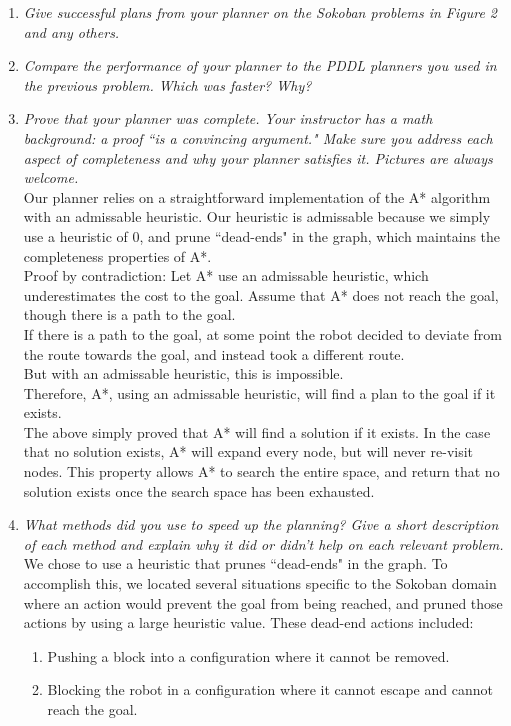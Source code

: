 \documentclass{article}
\begin{document}
\begin{enumerate}
\item{\textit{Give successful plans from your planner on the Sokoban problems in Figure 2 and any others.\\}}
\item{\textit{Compare the performance of your planner to the PDDL planners you used in the previous problem. Which was faster? Why?\\}}
\item{\textit{Prove that your planner was complete. Your instructor has a math background: a proof ``is a convincing argument." Make sure you address each aspect of completeness and why your planner satisfies it. Pictures are always welcome.\\}}
Our planner relies on a straightforward implementation of the A* algorithm with an admissable heuristic.  Our heuristic is admissable because we simply use a heuristic of 0, and prune ``dead-ends" in the graph, which maintains the completeness properties of A*.\\

Proof by contradiction:
Let A* use an admissable heuristic, which underestimates the cost to the goal.
Assume that A* does not reach the goal, though there is a path to the goal.\\
If there is a path to the goal, at some point the robot decided to deviate from the route towards the goal, and instead took a different route.\\
But with an admissable heuristic, this is impossible.\\
Therefore, A*, using an admissable heuristic, will find a plan to the goal if it exists.\\

The above simply proved that A* will find a solution if it exists.  In the case that no solution exists, A* will expand every node, but will never re-visit nodes.  This property allows A* to search the entire space, and return that no solution exists once the search space has been exhausted.

\item{\textit{What methods did you use to speed up the planning? Give a short description of each method and explain why it did or didn’t help on each relevant problem.\\}}
We chose to use a heuristic that prunes ``dead-ends" in the graph.  To accomplish this, we located several situations specific to the Sokoban domain where an action would prevent the goal from being reached, and pruned those actions by using a large heuristic value.  These dead-end actions included:
\begin{enumerate}
\item Pushing a block into a configuration where it cannot be removed.
\item Blocking the robot in a configuration where it cannot escape and cannot reach the goal.
\end{enumerate}

\end{enumerate}
\end{document}

